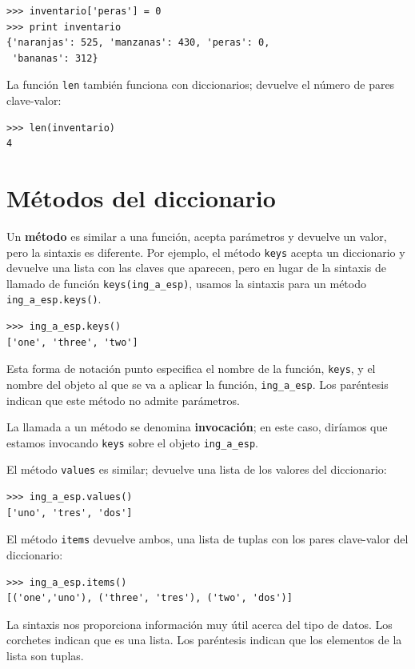 \beforeverb
\begin{verbatim}
>>> inventario['peras'] = 0
>>> print inventario
{'naranjas': 525, 'manzanas': 430, 'peras': 0, 
 'bananas': 312}
\end{verbatim}
\afterverb
%
La función \texttt{len} también funciona con diccionarios; devuelve el número de pares clave-valor:

\beforeverb
\begin{verbatim}
>>> len(inventario)
4
\end{verbatim}
\afterverb
%


\section{Métodos del diccionario}

Un {\bf método} es similar a una función, acepta parámetros y devuelve un valor, 
pero la sintaxis es diferente. Por ejemplo, el método \texttt{keys} acepta un 
diccionario y devuelve una lista con las claves que aparecen, pero en lugar de 
la sintaxis de llamado de función \texttt{keys(ing\_a\_esp)}, usamos la 
sintaxis para un método \texttt{ing\_a\_esp.keys()}.


\beforeverb
\begin{verbatim}
>>> ing_a_esp.keys()
['one', 'three', 'two']
\end{verbatim}
\afterverb
%
Esta forma de notación punto especifica el nombre de la función, \texttt{keys}, 
y el nombre del objeto al que se va a aplicar la función, \texttt{ing\_a\_esp}. 
Los paréntesis indican que este método no admite parámetros.

La llamada a un método se denomina {\bf invocación}; en este caso, diríamos 
que estamos invocando \texttt{keys} sobre el objeto \texttt{ing\_a\_esp}.

El método \texttt{values} es similar; devuelve una lista de los valores del 
diccionario:

\beforeverb
\begin{verbatim}
>>> ing_a_esp.values()
['uno', 'tres', 'dos']
\end{verbatim}
\afterverb
%
El método \texttt{items} devuelve ambos, una lista de tuplas con los pares 
clave-valor del diccionario:

\beforeverb
\begin{verbatim}
>>> ing_a_esp.items()
[('one','uno'), ('three', 'tres'), ('two', 'dos')]
\end{verbatim}
\afterverb
%
La sintaxis nos proporciona información muy útil acerca del tipo de datos. 
Los corchetes indican que es una lista. Los paréntesis indican que los 
elementos de la lista son tuplas.

